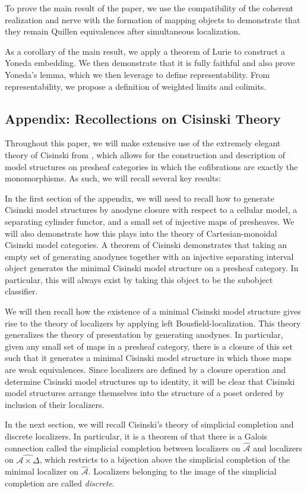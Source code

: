 \documentclass[a4paper]{article}
\numberwithin{equation}{subsection}
\theoremstyle{plain}   %
\theoremstyle{definition}
\theoremstyle{remark}
\theoremstyle{plain}
\newcommand{\psh}[1]{\ensuremath{\widehat{#1}}}
\begin{document}
To prove the main result of the paper, we use the compatibility of the coherent realization and nerve with the formation of mapping objects to demonstrate that they remain Quillen equivalences after simultaneous localization. 

As a corollary of the main result, we apply a theorem of Lurie to construct a Yoneda embedding.  We then demonstrate that it is fully faithful and also prove Yoneda's lemma, which we then leverage to define representability.  From representability, we propose a definition of weighted limits and colimits.  

\subsection*{Appendix: Recollections on Cisinski Theory}
Throughout this paper, we will make extensive use of the extremely elegant theory of Cisinski from \cite{cisinski-book}, which allows for the construction and description of model structures on presheaf categories in which the cofibrations are exactly the monomorphisms.  As such, we will recall several key results:

In the first section of the appendix, we will need to recall how to generate Cisinski model structures by anodyne closure with respect to a cellular model, a separating cylinder functor, and a small set of injective maps of presheaves.  We will also demonstrate how this plays into the theory of Cartesian-monoidal Cisinski model categories. A theorem of Cisinski demonstrates that taking an empty set of generating anodynes together with an injective separating interval object generates the minimal Cisinski model structure on a presheaf category. In particular, this will always exist by taking this object to be the subobject classifier.

We will then recall how the existence of a minimal Cisinski model structure gives rise to the theory of localizers by applying left Bousfield-localization.  This theory generalizes the theory of presentation by generating anodynes.  In particular, given any small set of maps in a presheaf category, there is a closure of this set such that it generates a minimal Cisinski model structure in which those maps are weak equivalences.  Since localizers are defined by a closure operation and determine Cisinski model structures up to identity, it will be clear that Cisinski model structures arrange themselves into the structure of a poset ordered by inclusion of their localizers.

In the next section, we will recall Cisinski's theory of simplicial completion and discrete localizers.  In particular, it is a theorem of \cite{cisinski-book} that there is a Galois connection called the simplicial completion between localizers on \(\psh{\mathcal{A}}\) and localizers on \(\psh{\mathcal{A}\times \Delta}\), which restricts to a bijection above the simplicial completion of the minimal localizer on \(\psh{\mathcal{A}}\). Localizers belonging to the image of the simplicial completion are called \emph{discrete}.
\end{document}
